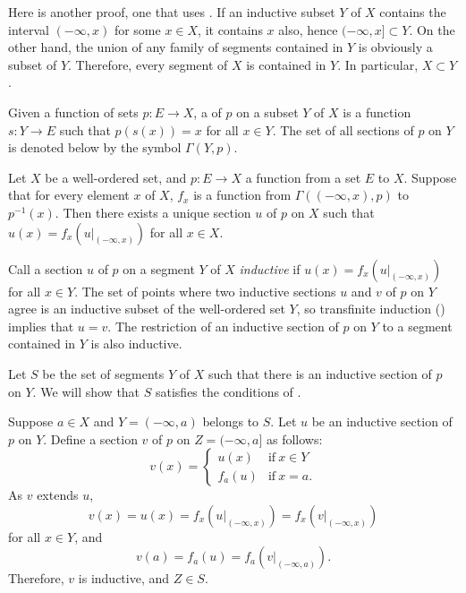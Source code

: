 \documentclass{article}
\begin{document}
Here is another proof, one that uses .  If an
inductive subset \(Y\) of \(X\) contains the interval \((-\infty, x)\)
for some \(x \in X\), it contains \(x\) also, hence
\((-\infty, x] \subset Y\).  On the other hand, the union of any
family of segments contained in \(Y\) is obviously a subset of \(Y\).
Therefore, every segment of \(X\) is contained in \(Y\).  In
particular, \(X \subset Y\).

Given a function of sets \(p : E \to X\), a  of
\(p\) on a subset \(Y\) of \(X\) is a function \(s : Y \to E\) such
that \(p(s(x)) = x\) for all \(x \in Y\).  The set of all sections of
\(p\) on \(Y\) is denoted below by the symbol \(\Gamma(Y, p)\).

\begin{theorem}
  \label{thm:srxrngd8}
  Let \(X\) be a well-ordered set, and \(p : E \to X\) a function from
  a set \(E\) to \(X\).  Suppose that for every element \(x\) of
  \(X\), \(f_x\) is a function from \(\Gamma((-\infty, x), p)\) to
  \(p^{-1}(x)\).  Then there exists a unique section \(u\) of \(p\) on
  \(X\) such that \(u(x) = f_x(u \vert_{(-\infty, x)})\) for all
  \(x \in X\).
\end{theorem}

Call a section \(u\) of \(p\) on a segment \(Y\) of \(X\)
\emph{inductive} if \(u(x) = f_x(u \vert_{(-\infty, x)})\) for all
\(x \in Y\).  The set of points where two inductive sections \(u\) and
\(v\) of \(p\) on \(Y\) agree is an inductive subset of the
well-ordered set \(Y\), so transfinite induction ()
implies that \(u = v\).  The restriction of an inductive section of
\(p\) on \(Y\) to a segment contained in \(Y\) is also inductive.

Let \(S\) be the set of segments \(Y\) of \(X\) such that there is an
inductive section of \(p\) on \(Y\).  We will show that \(S\)
satisfies the conditions of .

Suppose \(a \in X\) and \(Y = (-\infty, a)\) belongs to \(S\).  Let
\(u\) be an inductive section of \(p\) on \(Y\).  Define a section
\(v\) of \(p\) on \(Z = (-\infty, a]\) as follows:
\begin{displaymath}
  v(x) =
  \begin{cases}
    u(x) & \text{if} ~ x \in Y \\
    f_a(u) & \text{if} ~ x = a.
  \end{cases}
\end{displaymath}
As \(v\) extends \(u\),
\begin{displaymath}
  v(x) = u(x) = f_x(u \vert_{(-\infty, x)}) =
  f_x(v \vert_{(-\infty, x)})
\end{displaymath}
for all \(x \in Y\), and
\begin{displaymath}
  v(a) = f_a(u) = f_a(v \vert_{(-\infty, a)}).
\end{displaymath}
Therefore, \(v\) is inductive, and \(Z \in S\).
\end{document}

